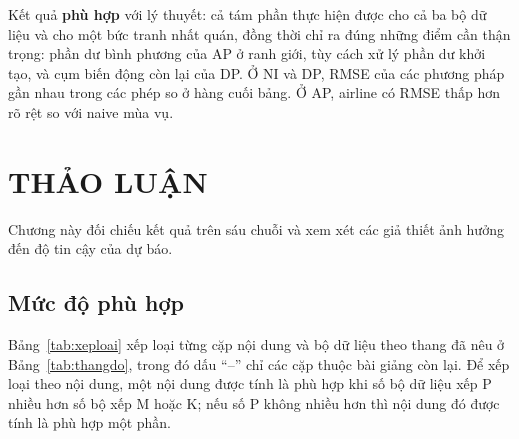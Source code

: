  Kết quả \textbf{phù hợp} với lý thuyết: cả tám phần thực hiện được cho cả ba bộ dữ liệu và cho một bức tranh nhất quán, đồng thời chỉ ra đúng những điểm cần thận trọng: phần dư bình phương của AP ở ranh giới, tùy cách xử lý phần dư khởi tạo, và cụm biến động còn lại của DP. Ở NI và DP, RMSE của các phương pháp gần nhau trong các phép so ở hàng cuối bảng. Ở AP, airline có RMSE thấp hơn rõ rệt so với naive mùa vụ.
\clearpage
\section[Thảo luận]{THẢO LUẬN}

Chương này đối chiếu kết quả trên sáu chuỗi và xem xét các giả thiết ảnh hưởng đến độ tin cậy của dự báo.

\subsection{Mức độ phù hợp}

Bảng~\ref{tab:xeploai} xếp loại từng cặp nội dung và bộ dữ liệu theo thang đã nêu ở Bảng~\ref{tab:thangdo}, trong đó dấu ``--'' chỉ các cặp thuộc bài giảng còn lại. Để xếp loại theo nội dung, một nội dung được tính là phù hợp khi số bộ dữ liệu xếp P nhiều hơn số bộ xếp M hoặc K; nếu số P không nhiều hơn thì nội dung đó được tính là phù hợp một phần.


